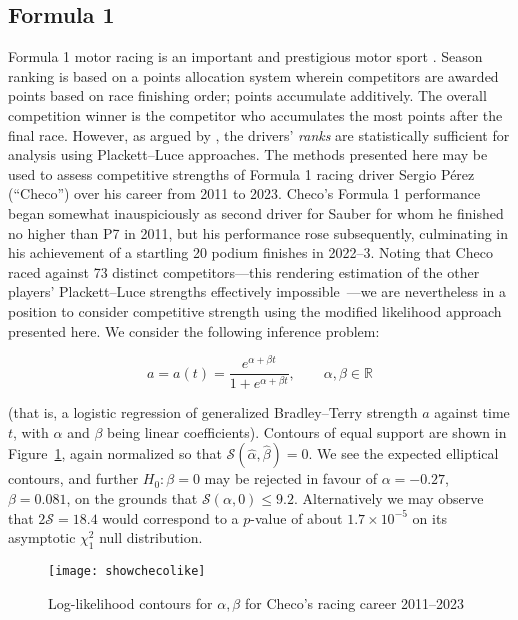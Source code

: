 \documentclass[article]{ajs}
\begin{document}
\subsection{Formula 1}

Formula 1 motor racing is an important and prestigious motor sport
\citep{codling2017,jenkins2010}.  Season ranking is based on a points
allocation system wherein competitors are awarded points based on race
finishing order; points accumulate additively.  The overall
competition winner is the competitor who accumulates the most points
after the final race.  However, as argued by
\cite{hankin2023_formula1points}, the drivers' {\em ranks} are
statistically sufficient for analysis using Plackett--Luce approaches.
The methods presented here may be used to assess competitive strengths
of Formula 1 racing driver Sergio P\'{e}rez (``Checo'') over his
career from 2011 to 2023.  Checo's Formula 1 performance began
somewhat inauspiciously as second driver for Sauber for whom he
finished no higher than P7 in 2011, but his performance rose
subsequently, culminating in his achievement of a startling 20 podium
finishes in 2022--3.  Noting that Checo raced against 73 distinct
competitors---this rendering estimation of the other players'
Plackett--Luce strengths effectively
impossible~\citep{hankin2020}---we are nevertheless in a position to
consider competitive strength using the modified likelihood approach
presented here.  We consider the following inference problem:

\begin{equation}
  a = a(t) = \frac{e^{\alpha + \beta t}}{1+e^{\alpha + \beta t}},\qquad\alpha,\beta\in\mathbb{R}
\end{equation}

(that is, a logistic regression of generalized Bradley--Terry strength
$a$ against time $t$, with $\alpha$ and $\beta$ being linear
coefficients).  Contours of equal support are shown in
Figure~\ref{showchecolike}, again normalized so that
$\mathcal{S}(\hat{\alpha},\hat{\beta})=0$.  We see the expected
elliptical contours, and further $H_0\colon\beta=0$ may be rejected in
favour of $\alpha=-0.27$, $\beta=0.081$, on the grounds that
$\mathcal{S}(\alpha,0)\leqslant 9.2$.  Alternatively we may observe
that $2\mathcal{S}=18.4$ would correspond to a $p$-value of about
$1.7\times 10^{-5}$ on its asymptotic $\chi^2_1$ null distribution.

\begin{figure}[t]
  \begin{centering}
\texttt{[image: showchecolike]}  %
\caption{Log-likelihood contours for $\alpha,\beta$ for Checo's racing
  career 2011--2023\label{showchecolike}}
\end{centering}
\end{figure}
\end{document}
